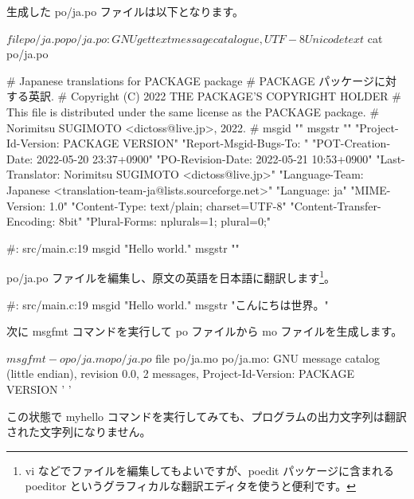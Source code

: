 \documentclass[mingoth,a4paper]{jsarticle}
\begin{document}
生成した po/ja.po ファイルは以下となります。

\begin{commandline}
$ file po/ja.po
po/ja.po: GNU gettext message catalogue, UTF-8 Unicode text

$ cat po/ja.po

# Japanese translations for PACKAGE package
# PACKAGE パッケージに対する英訳.
# Copyright (C) 2022 THE PACKAGE'S COPYRIGHT HOLDER
# This file is distributed under the same license as the PACKAGE package.
# Norimitsu SUGIMOTO <dictoss@live.jp>, 2022.
#
msgid ""
msgstr ""
"Project-Id-Version: PACKAGE VERSION\n"
"Report-Msgid-Bugs-To: \n"
"POT-Creation-Date: 2022-05-20 23:37+0900\n"
"PO-Revision-Date: 2022-05-21 10:53+0900\n"
"Last-Translator: Norimitsu SUGIMOTO <dictoss@live.jp>\n"
"Language-Team: Japanese <translation-team-ja@lists.sourceforge.net>\n"
"Language: ja\n"
"MIME-Version: 1.0\n"
"Content-Type: text/plain; charset=UTF-8\n"
"Content-Transfer-Encoding: 8bit\n"
"Plural-Forms: nplurals=1; plural=0;\n"

#: src/main.c:19
msgid "Hello world."
msgstr ""
\end{commandline}

po/ja.po ファイルを編集し、原文の英語を日本語に翻訳します\footnote{vi などでファイルを編集してもよいですが、poedit パッケージに含まれる poeditor というグラフィカルな翻訳エディタを使うと便利です。}。

\begin{commandline}
#: src/main.c:19
msgid "Hello world."
msgstr "こんにちは世界。"
\end{commandline}

次に msgfmt コマンドを実行して po ファイルから mo ファイルを生成します。

\begin{commandline}
$ msgfmt -o po/ja.mo po/ja.po
$ file po/ja.mo
po/ja.mo: GNU message catalog (little endian), revision 0.0, 2 messages,
Project-Id-Version: PACKAGE VERSION '
'
\end{commandline}

この状態で myhello コマンドを実行してみても、プログラムの出力文字列は翻訳された文字列になりません。

\end{document}
